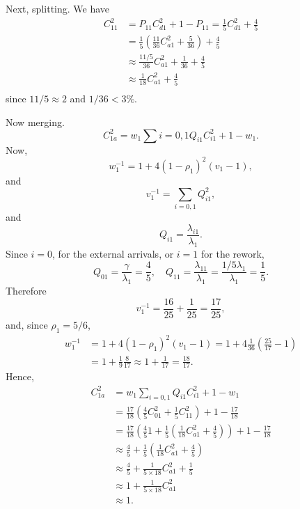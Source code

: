 \begin{exercise}
\begin{solution}
Next, splitting. We have
\begin{equation*}
  \begin{split}
  C_{11}^2 
&= P_{11}C_{d1}^2 + 1 - P_{11} = \frac{1}{5}C_{d1}^2 + \frac 45 \\
&=\frac{1}{5}\left(\frac{11}{36}C_{a1}^2 + \frac{5}{36}\right) + \frac 45 \\    
&\approx\frac{11/5}{36} C_{a1}^2 + \frac{1}{36} + \frac 45 \\
&\approx\frac{1}{18} C_{a1}^2 + \frac 45 \\
  \end{split}
\end{equation*}
since $11/5 \approx 2$ and $1/36 < 3\%$. 

Now merging.
\begin{equation*}
  C_{1a}^2 = w_1 \sum{i=0,1} Q_{i1} C_{i1}^2 + 1 - w_1.
\end{equation*}
Now, 
\begin{equation*}
  w_1^{-1} = 1 + 4(1-\rho_1)^2 (v_1-1),
\end{equation*}
and
\begin{equation*}
  v_1^{-1}=\sum_{i=0,1} Q_{i1}^2,
\end{equation*}
and 
\begin{equation*}
  Q_{i1} = \frac{\lambda_{i1}}{\lambda_1}.
\end{equation*}
Since $i=0$, for the external arrivals, or $i=1$ for the rework,
\begin{equation*}
  Q_{01} = \frac{\gamma}{\lambda_1} = \frac 45, \quad Q_{11}=\frac{\lambda_{11}}{\lambda_1} = \frac{1/5 \lambda_1 }{\lambda_1} = \frac 15.
\end{equation*}
Therefore
\begin{equation*}
  v_1^{-1}= \frac{16}{25}+\frac1{25} = \frac{17}{25},
\end{equation*}
and, since $\rho_1 = 5/6$,
\begin{equation*}
  \begin{split}
  w_1^{-1} 
&= 1 + 4(1-\rho_1)^2 (v_1-1) = 1 + 4\frac1{36}\left(\frac{25}{17}-1\right) \\
&= 1 + \frac1{9}\frac{8}{17} \approx 1 + \frac1{17} =\frac{18}{17}.
  \end{split}
\end{equation*}
Hence,
\begin{align*}
  C_{1a}^2 
&= w_1 \sum_{i=0,1} Q_{i1} C_{i1}^2 + 1 - w_1 \\
&= \frac{17}{18} \left(\frac 45 C_{01}^2 + \frac 1 5 C_{11}^2 \right) + 1 - \frac{17}{18}\\
&= \frac{17}{18} \left(\frac 45 1 + \frac 1 5 \left(\frac{1}{18} C_{a1}^2 + \frac 45\right)\right) + 1 - \frac{17}{18}\\
&\approx \frac 45 + \frac 1 5 \left(\frac{1}{18} C_{a1}^2 + \frac 45\right) \\
&\approx \frac 45 + \frac{1}{5\times 18} C_{a1}^2 + \frac 15 \\
&\approx 1 + \frac{1}{5\times 18} C_{a1}^2 \\
&\approx 1.
\end{align*}


\end{solution}
\end{exercise}
